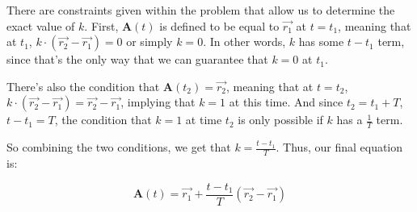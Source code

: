 \documentclass{article}
\theoremstyle{definition}
\numberwithin{equation}{section}
\numberwithin{definition}{section}
\begin{document}
There are constraints given within the problem that allow us to determine the exact value of $k$. First, $\mathbf{A}(t)$ is defined to be equal to $\vec{r_1}$ at $t = t_1$, meaning that at $t_1$, $k \cdot (\vec{r_2} - \vec{r_1}) = 0$ or simply $k=0$. In other words, $k$ has some $t-t_1$ term, since that's the only way that we can guarantee that $k=0$ at $t_1$. 

\medskip

There's also the condition that $\mathbf{A}(t_2) = \vec{r_2}$, meaning that at $t = t_2$, $k \cdot (\vec{r_2} - \vec{r_1}) = \vec{r_2}-\vec{r_1}$, implying that $k=1$ at this time. And since $t_2 = t_1+T$, $t-t_1 = T$, the condition that $k=1$ at time $t_2$ is only possible if $k$ has a $\frac{1}{T}$ term. 

\medskip

So combining the two conditions, we get that $k = \frac{t - t_1}{T}$. Thus, our final equation is:

\[ \mathbf{A}(t) = \vec{r_1} + \frac{t-t_1}{T} (\vec{r_2} - \vec{r_1})\]
\end{document}

